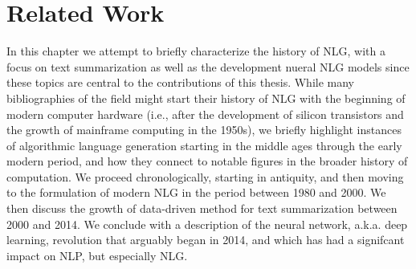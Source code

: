 \chapter{Related Work}
\label{ch:relwork}

\startglyph In this chapter we attempt to briefly characterize the history of NLG, with a focus
on text summarization as well as the development nueral NLG models since
these topics are central to the contributions of this thesis. While many
bibliographies of the field might start their history of NLG 
with the beginning
of modern computer hardware (i.e., after the development of silicon transistors and the growth of mainframe computing
in the 1950s), we briefly highlight instances of algorithmic language 
generation starting in the middle ages through the early modern period,
and how they connect to notable figures in the broader history of computation.
We proceed chronologically, starting in antiquity, and then moving to the formulation of modern NLG in the period between 1980 and 2000. We then discuss 
the growth of data-driven method for text summarization between 2000 and 2014.
We conclude with a description of the neural network, a.k.a. deep learning,
revolution that arguably began in 2014, and which has had a signifcant 
impact on NLP, but especially NLG. 




